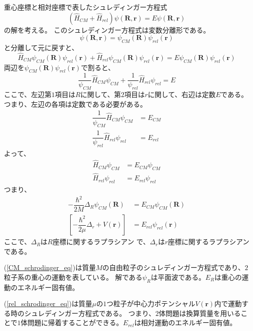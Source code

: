 \documentclass[a4paper,16pt]{jsarticle}
\begin{document}
重心座標と相対座標で表したシュレディンガー方程式
\begin{equation}
	(\hat{H}_{CM} + \hat{H}_{rel})\psi(\bm{R},\bm{r}) = E\psi(\bm{R},\bm{r})
\end{equation}
の解を考える。
このシュレディンガー方程式は変数分離形である。
\begin{equation}
	\psi(\bm{R},\bm{r}) = \psi_{CM}(\bm{R})\psi_{rel}(\bm{r})
\end{equation}
と分離して元に戻すと、
\begin{equation}
	\hat{H}_{CM}\psi_{CM}(\bm{R})\psi_{rel}(\bm{r}) + \hat{H}_{rel}\psi_{CM}(\bm{R})\psi_{rel}(\bm{r}) = E\psi_{CM}(\bm{R})\psi_{rel}(\bm{r})
\end{equation}
両辺を$\psi_{CM}(\bm{R})\psi_{rel}(\bm{r})$で割ると、
\begin{equation}
	\dfrac{1}{\psi_{CM}}\hat{H}_{CM}\psi_{CM} + \dfrac{1}{\psi_{rel}}\hat{H}_{rel}\psi_{rel} = E
\end{equation}
ここで、左辺第$1$項目は$R$に関して、第$2$項目は$r$に関して、右辺は定数$E$である。
つまり、左辺の各項は定数である必要がある。
\begin{align}
	\dfrac{1}{\psi_{CM}}\hat{H}_{CM}\psi_{CM} &= E_{CM} \\
	\dfrac{1}{\psi_{rel}}\hat{H}_{rel}\psi_{rel} &= E_{rel}
\end{align}
よって、
\begin{align}
	\hat{H}_{CM}\psi_{CM} &= E_{CM}\psi_{CM} \\
	\hat{H}_{rel}\psi_{rel} &= E_{rel}\psi_{rel}
\end{align}
つまり、
\begin{align}
	\label{CM_schrodinger_eq}
	-\dfrac{\hbar^2}{2M}\Delta_R\psi_{CM}(\bm{R}) &= E_{CM}\psi_{CM}(\bm{R}) \\
	\label{rel_schrodinger_eq}
	\left[ -\dfrac{\hbar^2}{2\mu}\Delta_r + V(\bm{r})\right] &= E_{rel}\psi_{rel}(\bm{r})
\end{align}
ここで、$\Delta_R$は$R$座標に関するラプラシアン で、$\Delta_r$は$r$座標に関するラプラシアンである。

(\ref{CM_schrodinger_eq})は質量$M$の自由粒子のシュレディンガー方程式であり、$2$粒子系の重心の運動を表している。
解である$\psi_R$は平面波である。$E_R$は重心の運動のエネルギー固有値。

(\ref{rel_schrodinger_eq})は質量$\mu$の$1$つ粒子が中心力ポテンシャル$V(\bm{r})$内で運動する時のシュレディンガー方程式である。
つまり、$2$体問題は換算質量を用いることで$1$体問題に帰着することができる。$E_{rel}$は相対運動のエネルギー固有値。
\end{document}
